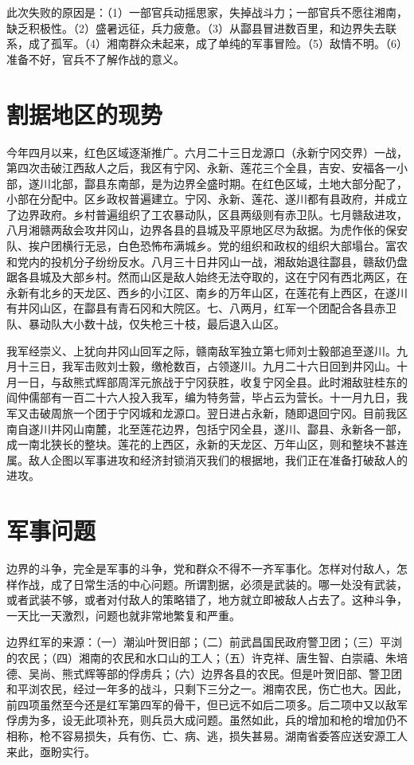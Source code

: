 此次失败的原因是：（1）一部官兵动摇思家，失掉战斗力；一部官兵不愿往湘南，缺乏积极性。（2）盛暑远征，兵力疲惫。（3）从酃县冒进数百里，和边界失去联系，成了孤军。（4）湘南群众未起来，成了单纯的军事冒险。（5）敌情不明。（6）准备不好，官兵不了解作战的意义。

\section{割据地区的现势}

今年四月以来，红色区域逐渐推广。六月二十三日龙源口（永新宁冈交界）一战，第四次击破江西敌人之后，我区有宁冈、永新、莲花三个全县，吉安、安福各一小部，遂川北部，酃县东南部，是为边界全盛时期。在红色区域，土地大部分配了，小部在分配中。区乡政权普遍建立。宁冈、永新、莲花、遂川都有县政府，并成立了边界政府。乡村普遍组织了工农暴动队，区县两级则有赤卫队。七月赣敌进攻，八月湘赣两敌会攻井冈山，边界各县的县城及平原地区尽为敌据。为虎作伥的保安队、挨户团横行无忌，白色恐怖布满城乡。党的组织和政权的组织大部塌台。富农和党内的投机分子纷纷反水。八月三十日井冈山一战，湘敌始退往酃县，赣敌仍盘踞各县城及大部乡村。然而山区是敌人始终无法夺取的，这在宁冈有西北两区，在永新有北乡的天龙区、西乡的小江区、南乡的万年山区，在莲花有上西区，在遂川有井冈山区，在酃县有青石冈和大院区。七、八两月，红军一个团配合各县赤卫队、暴动队大小数十战，仅失枪三十枝，最后退入山区。

我军经崇义、上犹向井冈山回军之际，赣南敌军独立第七师刘士毅部追至遂川。九月十三日，我军击败刘士毅，缴枪数百，占领遂川。九月二十六日回到井冈山。十月一日，与敌熊式辉部周浑元旅战于宁冈获胜，收复宁冈全县。此时湘敌驻桂东的阎仲儒部有一百二十六人投入我军，编为特务营，毕占云为营长。十一月九日，我军又击破周旅一个团于宁冈城和龙源口。翌日进占永新，随即退回宁冈。目前我区南自遂川井冈山南麓，北至莲花边界，包括宁冈全县，遂川、酃县、永新各一部，成一南北狭长的整块。莲花的上西区，永新的天龙区、万年山区，则和整块不甚连属。敌人企图以军事进攻和经济封锁消灭我们的根据地，我们正在准备打破敌人的进攻。

\section{军事问题}

边界的斗争，完全是军事的斗争，党和群众不得不一齐军事化。怎样对付敌人，怎样作战，成了日常生活的中心问题。所谓割据，必须是武装的。哪一处没有武装，或者武装不够，或者对付敌人的策略错了，地方就立即被敌人占去了。这种斗争，一天比一天激烈，问题也就非常地繁复和严重。

边界红军的来源：（一）潮汕叶贺旧部；（二）前武昌国民政府警卫团；（三）平浏的农民；（四）湘南的农民和水口山的工人；（五）许克祥、唐生智、白崇禧、朱培德、吴尚、熊式辉等部的俘虏兵；（六）边界各县的农民。但是叶贺旧部、警卫团和平浏农民，经过一年多的战斗，只剩下三分之一。湘南农民，伤亡也大。因此，前四项虽然至今还是红军第四军的骨干，但已远不如后二项多。后二项中又以敌军俘虏为多，设无此项补充，则兵员大成问题。虽然如此，兵的增加和枪的增加仍不相称，枪不容易损失，兵有伤、亡、病、逃，损失甚易。湖南省委答应送安源工人来此，亟盼实行。


